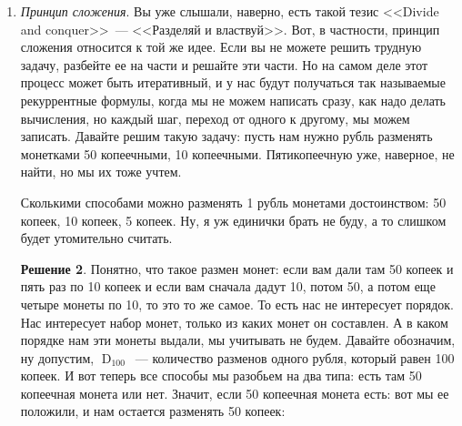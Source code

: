 \documentclass[russian]{lecture-notes}
\theoremstyle{definition}
\newtheorem*{solution}{Решение}
\DeclareMathOperator{\KRAZ}{D}
\newcommand{\DN}[1]{\KRAZ_{#1}}
\begin{document}
\begin{enumerate}
\begin{solution}
			\[
			A \times D \times D \times D \times A \times A = |A| \cdot |D| \cdot |D| \cdot |D| \cdot |A| \cdot |A|
			\]
			
			В правой части выражения мы перемножаем числа. В левой части выражения множества менять местами нельзя, иначе другой набор будет, а вот в правой $|A|$~--- количество букв, $|D|$~--- количество цифр, поэтому числа я могу переставлять:
			
			\[
			|A| \cdot |D| \cdot |D| \cdot |D| \cdot |A| \cdot |A| = |A|^3 \cdot |B|^3
			\]
			
			Как вы думаете сколько там букв можно брать? 20 больше, меньше? Мне считать не хочется. 20 в куб легче возводить и 10 в куб:
			
			\[
			|A|^3 \cdot |B|^3 \approx 20^3 \cdot 10^3 = 8000000
			\]
		\end{solution}
		
		Теперь давайте следующую задачу. Мы ее назовем, если тут было правило умножения или принцип умножения, то тут будет правило сложения или принцип сложение. Но я лучше не правило, а принцип напишу, потому что эта идея достаточно общая.
		
		
		\item \emph{Принцип сложения}. Вы уже слышали, наверно, есть такой тезис <<Divide and conquer>>~--- <<Разделяй и властвуй>>. Вот, в частности, принцип сложения относится к той же идее. Если вы не можете решить трудную задачу, разбейте ее на части и решайте эти части. Но на самом деле этот процесс может быть итеративный, и у нас будут получаться так называемые рекуррентные формулы, когда мы не можем написать сразу, как надо делать вычисления, но каждый шаг, переход от одного к другому, мы можем записать. Давайте решим такую задачу: пусть нам нужно рубль разменять монетками 50 копеечными, 10 копеечными. Пятикопеечную уже, наверное, не найти, но мы их тоже учтем.
		
		
		\begin{problem}
			Сколькими способами можно разменять 1 рубль монетами достоинством: 50 копеек, 10 копеек, 5 копеек. Ну, я уж единички брать не буду, а то слишком будет утомительно считать. 
		\end{problem}
			
		\begin{solution}
			Понятно, что такое размен монет: если вам дали там 50 копеек и пять раз по 10 копеек и если вам сначала дадут 10, потом 50, а потом еще четыре монеты по 10, то это то же самое. То есть нас не интересует порядок. Нас интересует набор монет, только из каких монет он составлен. А в каком порядке нам эти монеты выдали, мы учитывать не будем. Давайте обозначим, ну допустим, $\DN{100}$~--- количество разменов одного рубля, который равен 100 копеек. И вот теперь все способы мы разобьем на два типа: есть там 50 копеечная монета или нет. Значит, если 50 копеечная монета есть: вот мы ее положили, и нам остается разменять 50 копеек:
			

\end{solution}
\end{enumerate}
\end{document}
